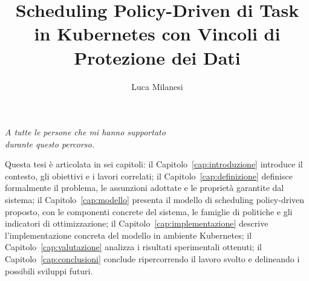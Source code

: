 \documentclass[12pt]{report}
\title{Scheduling Policy-Driven di Task in Kubernetes con Vincoli di Protezione dei Dati}
\author{Luca Milanesi}
\begin{document}
\makecenteredfrontpage

% 
%

{\raggedleft \large \sl 
A tutte le persone che mi hanno supportato\\
durante questo percorso.\\
}

\clearpage
\beforepreface

% 
%



Questa tesi è articolata in sei capitoli: il Capitolo~\ref{cap:introduzione} introduce il contesto, gli obiettivi e i lavori correlati; il Capitolo~\ref{cap:definizione} definisce formalmente il problema, le assunzioni adottate e le proprietà garantite dal sistema; il Capitolo~\ref{cap:modello} presenta il modello di scheduling policy-driven proposto, con le componenti concrete del sistema, le famiglie di politiche e gli indicatori di ottimizzazione; il Capitolo~\ref{cap:implementazione} descrive l'implementazione concreta del modello in ambiente Kubernetes; il Capitolo~\ref{cap:valutazione} analizza i risultati sperimentali ottenuti; il Capitolo~\ref{cap:conclusioni} conclude ripercorrendo il lavoro svolto e delineando i possibili sviluppi futuri.

%
%


% 
%


\printnomenclature

%
%

\afterpreface
\newpage
\thispagestyle{empty}
\mbox{}
\newpage
\setcounter{page}{1}

% 
%
\end{document}
